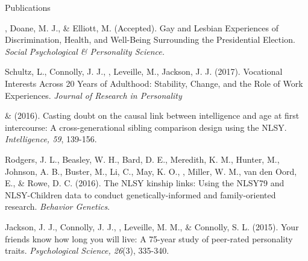 \begin{rSection}{\textrm{Publications}}%
\begin{etaremune}
\item\meb, Doane, M. J., \& Elliott, M. (Accepted). Gay and Lesbian Experiences of Discrimination, Health, and Well-Being Surrounding the Presidential Election. \textit{Social Psychological \& Personality Science.}  \href{https://dx.doi.org/10.17605/OSF.IO/DWSCM}{\color{blue}{https://osf.io/dwscm/}}
\item Schultz, L., Connolly, J. J., \meb, Leveille, M., Jackson, J. J. (2017). Vocational Interests Across 20 Years of Adulthood: Stability, Change, and the Role of Work Experiences. \textit{Journal of Research in Personality}
\item\meb \& \Joe (2016). Casting doubt on the causal link between intelligence and age at first intercourse: A cross-generational sibling comparison design using the NLSY. \textit{Intelligence, 59}, 139-156. \href{http://www.sciencedirect.com/science/article/pii/S0160289616300162}{\color{blue}{doi:10.1016/j.intell.2016.08.008}}
\item Rodgers, J. L., Beasley, W. H., Bard, D. E., Meredith, K. M., Hunter, M., Johnson, A. B., Buster, M., Li, C., May, K. O., \meb, Miller, W. M., van den Oord, E., \& Rowe, D. C. (2016). The NLSY kinship links: Using the NLSY79 and NLSY-Children data to conduct genetically-informed and family-oriented research. \textit{Behavior Genetics}. \href{http://dx.doi.org/10.1007/s10519-016-9785-3}{\color{blue}{doi:10.1007/s10519-016-9785-3}}
%
\item Jackson, J. J., Connolly, J. J., \meb, Leveille, M. M., \& Connolly, S. L. (2015). Your friends know how long you will live: A 75-year study of peer-rated personality traits. \textit{Psychological Science, 26}(3), 335-340.\\ \href{http://pss.sagepub.com/content/26/3/335}{\color{blue}{doi:10.1177/0956797614561800}}
\end{etaremune}\end{rSection}%